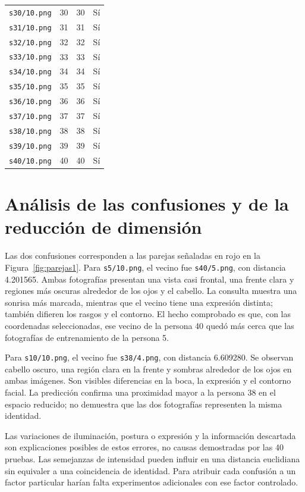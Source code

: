\documentclass[11pt,a4paper]{article}
\newcommand{\archivo}[1]{\texttt{#1}}
\begin{document}
\begin{table}[h]
\begin{tabular}{lccc}
\archivo{s30/10.png} & 30 & 30 & Sí\\
\archivo{s31/10.png} & 31 & 31 & Sí\\
\archivo{s32/10.png} & 32 & 32 & Sí\\
\archivo{s33/10.png} & 33 & 33 & Sí\\
\archivo{s34/10.png} & 34 & 34 & Sí\\
\archivo{s35/10.png} & 35 & 35 & Sí\\
\archivo{s36/10.png} & 36 & 36 & Sí\\
\archivo{s37/10.png} & 37 & 37 & Sí\\
\archivo{s38/10.png} & 38 & 38 & Sí\\
\archivo{s39/10.png} & 39 & 39 & Sí\\
\archivo{s40/10.png} & 40 & 40 & Sí\\
\bottomrule
\end{tabular}
\end{table}

\clearpage
\section{Análisis de las confusiones y de la reducción de dimensión}
Las dos confusiones corresponden a las parejas señaladas en rojo en la
Figura~\ref{fig:parejas1}. Para \archivo{s5/10.png}, el vecino fue
\archivo{s40/5.png}, con distancia 4.201565. Ambas fotografías presentan una
vista casi frontal, una frente clara y regiones más oscuras alrededor de los
ojos y el cabello. La consulta muestra una sonrisa más marcada, mientras que el
vecino tiene una expresión distinta; también difieren los rasgos y el contorno.
El hecho comprobado es que, con las coordenadas seleccionadas, ese vecino de la
persona 40 quedó más cerca que las fotografías de entrenamiento de la persona 5.

Para \archivo{s10/10.png}, el vecino fue \archivo{s38/4.png}, con distancia
6.609280. Se observan cabello oscuro, una región clara en la frente y sombras
alrededor de los ojos en ambas imágenes. Son visibles diferencias en la boca,
la expresión y el contorno facial. La predicción confirma una proximidad mayor
a la persona 38 en el espacio reducido; no demuestra que las dos fotografías
representen la misma identidad.

Las variaciones de iluminación, postura o expresión y la información descartada
son explicaciones posibles de estos errores, no causas demostradas por las 40
pruebas. Las semejanzas de intensidad pueden influir en una distancia euclidiana
sin equivaler a una coincidencia de identidad. Para atribuir cada confusión a un
factor particular harían falta experimentos adicionales con ese factor controlado.
\end{document}
